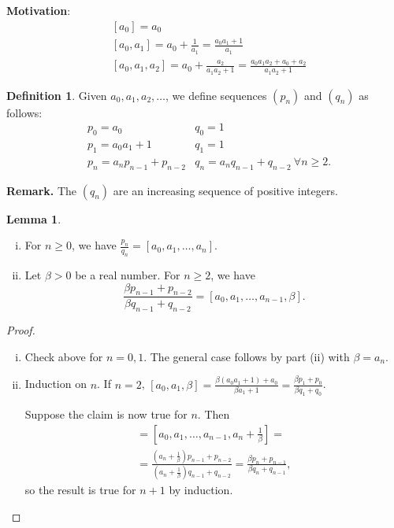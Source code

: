 \documentclass{article}
\theoremstyle{definition}
\newtheorem{lemma}[theorem]{Lemma}
\newtheorem{defn}{Definition}[section]
\begin{document}
\textbf{Motivation}:
\begin{align*}
    &[a_0]=a_0 \\
    &[a_0,a_1]=a_0+\frac{1}{a_1}=\frac{a_0a_1+1}{a_1}\\
    &[a_0,a_1,a_2]=a_0 + \frac{a_2}{a_1a_2+1} = \frac{a_0a_1a_2+a_0+a_2}{a_1a_2+1}
\end{align*}
\begin{defn}
    Given $a_0,a_1,a_2,\ldots$, we define sequences $(p_n)$ and $(q_n)$ as follows:
    \begin{align*}
        &p_0=a_0 &q_0=1 \\
        &p_1=a_0a_1+1 &q_1=1 \\
        &p_n=a_np_{n-1}+p_{n-2} &q_n=a_nq_{n-1}+q_{n-2} ~\forall n\ge 2. 
    \end{align*}
\end{defn}
\textbf{Remark.} The $(q_n)$ are an increasing sequence of positive integers.
\begin{lemma}
    \begin{enumerate}[(i)]
        \item For $n\ge 0$, we have $\frac{p_n}{q_n}=[a_0,a_1,\ldots,a_n]$.
        \item Let $\beta>0$ be a real number. For $n\ge 2$, we have $$\frac{\beta p_{n-1}+p_{n-2}}{\beta q_{n-1}+q_{n-2}}=[a_0,a_1,\ldots,a_{n-1},\beta].$$
    \end{enumerate}
\end{lemma}
\begin{proof}
    \begin{enumerate}[(i)]
        \item Check above for $n=0,1$. The general case follows by part (ii) with $\beta=a_n$.
        \item Induction on $n$. If $n=2$, $[a_0,a_1,\beta]=\frac{\beta(a_0a_1+1)+a_0}{\beta a_1+1} = \frac{\beta p_1 + p_0}{\beta q_1 + q_0}$.
        \vspace{1mm}
        
        Suppose the claim is now true for $n$. Then
        \begin{align*}
            [a_0,\ldots,a_n,\beta] = [a_0,a_1,\ldots,a_{n-1},a_n+\frac{1}{\beta}]=\\
            =\frac{(a_n+\frac{1}{\beta})p_{n-1}+p_{n-2}}{(a_n+\frac{1}{\beta})q_{n-1}+q_{n-2}} = \frac{\beta p_n + p_{n-1}}{\beta q_n + q_{n-1}},
        \end{align*}
        so the result is true for $n+1$ by induction.
    \end{enumerate}
\end{proof}
\end{document}
